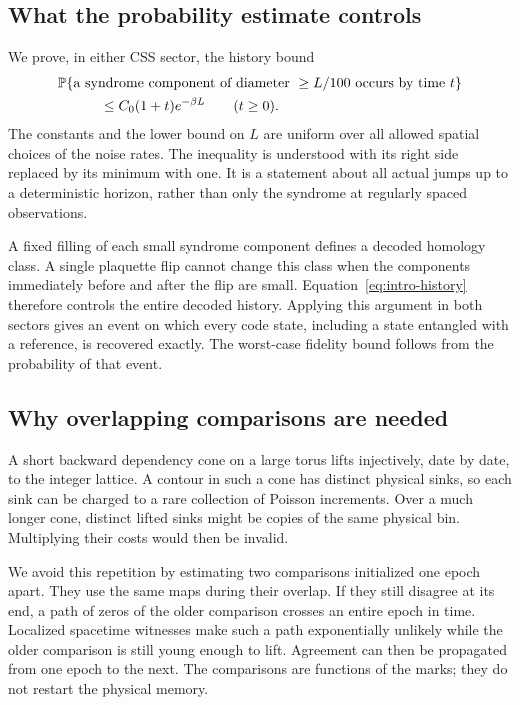 \subsection{What the probability estimate controls}

We prove, in either CSS sector, the history bound
\begin{equation}\label{eq:intro-history}
 \begin{aligned}
 &\mathbb P\{\text{a syndrome component of diameter }\ge L/100
             \text{ occurs by time }t\}\\
 &\hspace{3em}\le C_0(1+t)e^{-\beta L}
 \qquad(t\ge0).
 \end{aligned}
\end{equation}
The constants and the lower bound on \(L\) are uniform over all allowed
spatial choices of the noise rates. The inequality is understood with
its right side replaced by its minimum with one. It is a statement
about all actual jumps up to a deterministic horizon, rather than only
the syndrome at regularly spaced observations.

A fixed filling of each small syndrome component defines a decoded
homology class. A single plaquette flip cannot change this class when
the components immediately before and after the flip are small.
Equation~\eqref{eq:intro-history} therefore controls the entire decoded
history. Applying this argument in both sectors gives an event on
which every code state, including a state entangled with a reference,
is recovered exactly. The worst-case fidelity bound follows from the
probability of that event.

\subsection{Why overlapping comparisons are needed}

A short backward dependency cone on a large torus lifts injectively,
date by date, to the integer lattice. A contour in such a cone has
distinct physical sinks, so each sink can be charged to a rare
collection of Poisson increments. Over a much longer cone, distinct
lifted sinks might be copies of the same physical bin. Multiplying
their costs would then be invalid.

We avoid this repetition by estimating two comparisons initialized one
epoch apart. They use the same maps during their overlap. If they
still disagree at its end, a path of zeros of the older comparison
crosses an entire epoch in time. Localized spacetime witnesses make
such a path exponentially unlikely while the older comparison is
still young enough to lift. Agreement can then be propagated from one
epoch to the next. The comparisons are functions of the marks; they do
not restart the physical memory.

